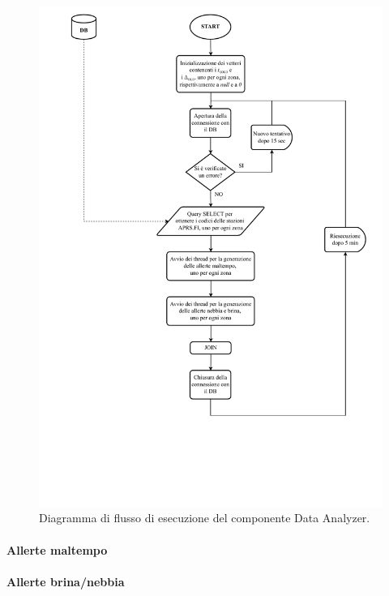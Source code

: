\begin{figure}[h!]
	\centering
	\includegraphics[width=1\linewidth]{./Iterazione 3/OtherFiles/FC - data analyzer}
	\caption{Diagramma di flusso di esecuzione del componente Data Analyzer.}
	\label{fig:DAFlowChart}
\end{figure}

\paragraph{Allerte maltempo}
\paragraph{Allerte brina/nebbia}
